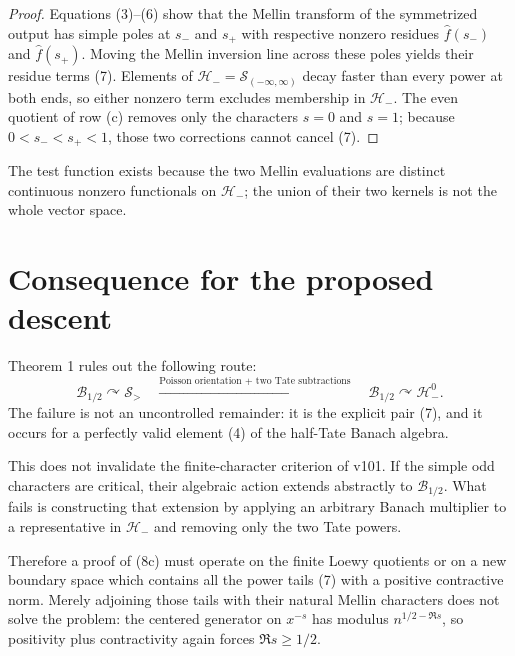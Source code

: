 \documentclass[11pt]{article}
\begin{document}
\begin{proof}
Equations (3)--(6) show that the Mellin transform of the symmetrized output
has simple poles at $s_-$ and $s_+$ with respective nonzero residues
$\widehat f(s_-)$ and $\widehat f(s_+)$.  Moving the Mellin inversion line
across these poles yields their residue terms (7).  Elements of
$\mathcal H_-=\mathcal S_{(-\infty,\infty)}$ decay faster than every power
at both ends, so either nonzero term excludes membership in $\mathcal H_-$.
The even quotient of row (c) removes only the characters $s=0$ and $s=1$;
because $0<s_-<s_+<1$, those two corrections cannot cancel (7).
\end{proof}

The test function exists because the two Mellin evaluations are distinct
continuous nonzero functionals on $\mathcal H_-$; the union of their two
kernels is not the whole vector space.

\section{Consequence for the proposed descent}

Theorem 1 rules out the following route:
\[
 \mathcal B_{1/2}\curvearrowright\mathcal S_>
 \quad\xrightarrow{\text{Poisson orientation + two Tate subtractions}}\quad
 \mathcal B_{1/2}\curvearrowright\mathcal H_-^0.
\]
The failure is not an uncontrolled remainder: it is the explicit pair
(7), and it occurs for a perfectly valid element (4) of the half-Tate
Banach algebra.

This does not invalidate the finite-character criterion of v101.  If the
simple odd characters are critical, their algebraic action extends
abstractly to $\mathcal B_{1/2}$.  What fails is constructing that extension
by applying an arbitrary Banach multiplier to a representative in
$\mathcal H_-$ and removing only the two Tate powers.

Therefore a proof of (8c) must operate on the finite Loewy quotients or on a
new boundary space which contains all the power tails (7) with a positive
contractive norm.  Merely adjoining those tails with their natural Mellin
characters does not solve the problem: the centered generator on
$x^{-s}$ has modulus $n^{1/2-\Re s}$, so positivity plus contractivity again
forces $\Re s\ge1/2$.
\end{document}

